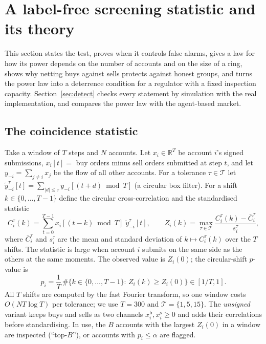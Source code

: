 \section{A label-free screening statistic and its theory}\label{sec:method}

This section states the test, proves when it controls false alarms, gives a law for how its power depends on the number of accounts and on the size of a ring, shows why netting buys against sells protects against honest groups, and turns the power law into a deterrence condition for a regulator with a fixed inspection capacity. Section~\ref{sec:detect} checks every statement by simulation with the real implementation, and compares the power law with the agent-based market.

\subsection{The coincidence statistic}\label{sec:stat}

Take a window of $T$ steps and $N$ accounts. Let $x_i\in\mathbb R^T$ be account $i$'s signed submissions, $x_i[t]=$ buy orders minus sell orders submitted at step $t$, and let $y_{-i}=\sum_{j\ne i}x_j$ be the flow of all other accounts. For a tolerance $\tau\in\mathcal T$ let $\tilde y^{\tau}_{-i}[t]=\sum_{|d|\le\tau}y_{-i}[(t+d)\bmod T]$ (a circular box filter). For a shift $k\in\{0,\dots,T-1\}$ define the circular cross-correlation and the standardised statistic
\begin{equation}
C^{\tau}_i(k)=\sum_{t=0}^{T-1}x_i[(t-k)\bmod T]\;\tilde y^{\tau}_{-i}[t],\qquad
Z_i(k)=\max_{\tau\in\mathcal T}\frac{C^{\tau}_i(k)-\bar C^{\tau}_i}{s^{\tau}_i},
\label{eq:Z}
\end{equation}
where $\bar C^{\tau}_i$ and $s^{\tau}_i$ are the mean and standard deviation of $k\mapsto C^{\tau}_i(k)$ over the $T$ shifts. The statistic is large when account $i$ submits on the same side as the others at the same moments. The observed value is $Z_i(0)$; the circular-shift $p$-value is
\begin{equation}
p_i=\frac1T\,\#\{k\in\{0,\dots,T-1\}:\,Z_i(k)\ge Z_i(0)\}\in[1/T,1].
\label{eq:p}
\end{equation}
All $T$ shifts are computed by the fast Fourier transform, so one window costs $O(NT\log T)$ per tolerance; we use $T=300$ and $\mathcal T=\{1,5,15\}$. The \emph{unsigned} variant keeps buys and sells as two channels $x^{\mathrm b}_i,x^{\mathrm s}_i\ge0$ and adds their correlations before standardising. In use, the $B$ accounts with the largest $Z_i(0)$ in a window are inspected (``top-$B$''), or accounts with $p_i\le\alpha$ are flagged.

